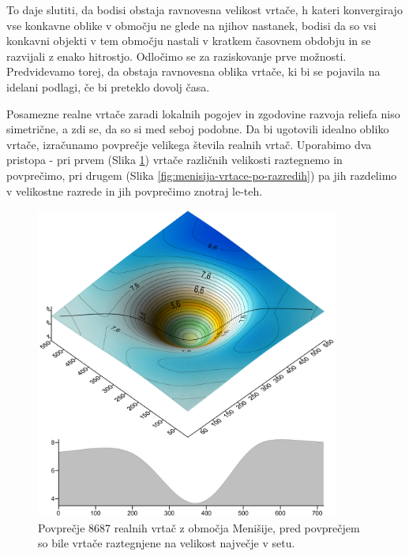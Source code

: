 \documentclass[a4paper, oneside, 12pt]{book}
\begin{document}
        To daje slutiti, da bodisi obstaja ravnovesna velikost vrtače, h kateri konvergirajo vse konkavne oblike v območju ne glede na njihov nastanek, bodisi da so vsi konkavni objekti v tem območju nastali v kratkem časovnem obdobju in se razvijali z enako hitrostjo. Odločimo se za raziskovanje prve možnosti.
        Predvidevamo torej, da obstaja ravnovesna oblika vrtače, ki bi se pojavila na idelani podlagi, če bi preteklo dovolj časa.

        Posamezne realne vrtače zaradi lokalnih pogojev in zgodovine razvoja reliefa niso simetrične, a zdi se, da so si med seboj podobne. Da bi ugotovili idealno obliko vrtače, izračunamo povprečje velikega števila realnih vrtač. Uporabimo dva pristopa - pri prvem (Slika \ref{fig:menisija-vrtaca}) vrtače različnih velikosti raztegnemo in povprečimo, pri drugem (Slika \ref{fig:menisija-vrtace-po-razredih}) pa jih razdelimo v velikostne razrede in jih povprečimo znotraj le-teh. 

        \begin{figure}[H]
          \centering
          \includegraphics[width=10cm]{slike/menisija-vrtaca}
          \caption{Povprečje 8687 realnih vrtač z območja Menišije, pred povprečjem so bile vrtače raztegnjene na velikost največje v setu.}
          \label{fig:menisija-vrtaca}
        \end{figure}
\end{document}

